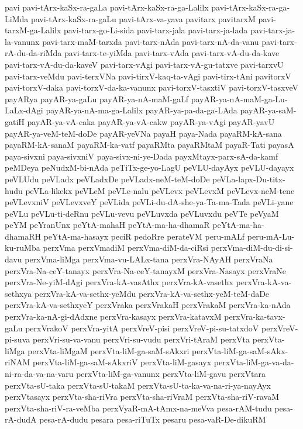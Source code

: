 {pavi
pavi-tArx-kaSx-ra-gaLa
pavi-tArx-kaSx-ra-ga-Lalilx
pavi-tArx-kaSx-ra-ga-LiMda
pavi-tArx-kaSx-ra-gaLu
pavi-tArx-va-yava
pavitarx
pavitarxM
pavi-tarxM-ga-Lalilx
pavi-tarx-go-Li-sida
pavi-tarx-jala
pavi-tarx-ja-lada
pavi-tarx-ja-la-vanunx
pavi-tarx-maM-tarxda
pavi-tarx-nAda
pavi-tarx-nA-da-vanu
pavi-tarx-rA-du-da-riMda
pavi-tarx-te-yiMda
pavi-tarx-vAda
pavi-tarx-vA-du-da-kave
pavi-tarx-vA-du-da-kaveV
pavi-tarx-vAgi
pavi-tarx-vA-gu-tatxve
pavi-tarxvU
pavi-tarx-veMdu
pavi-terxVNa
pavi-tirxV-kaq-ta-vAgi
pavi-tirx-tAni
pavitorxV
pavi-torxV-daka
pavi-torxV-da-ka-vanunx
pavi-torxV-tasxtiV
pavi-torxV-tasxveV
payARya
payAR-ya-gaLu
payAR-ya-nA-maM-gaLf
payAR-ya-nA-maM-ga-Lu-LaLx-dAgi
payAR-ya-nA-ma-ga-Lalilx
payAR-ya-pa-da-ga-LAda
payAR-ya-saM-gatiH
payAR-ya-vA-caka
payAR-ya-vA-cakw
payAR-ya-vAgi
payAR-yavU
payAR-ya-veM-teM-doDe
payAR-yeVNa
payaH
paya-Nada
payaRM-kA-sana
payaRM-kA-sanaM
payaRM-ka-vatf
payaRMta
payaRMtaM
payaR-Tati
payasA
paya-sivxni
paya-sivxniV
paya-sivx-ni-ye-Dada
payxMtayx-parx-sA-da-kamf
peMDeya
peNudxM-bi-nAda
peTiTx-ge-yo-LagU
peVLU-dayAyx
peVLU-dayayx
peVLUdu
peVLadx
peVLadxDe
peVLadx-neM-teM-doDe
peVLa-lapx-Du-titx-hudu
peVLa-likekx
peVLeM
peVLe-nalu
peVLevx
peVLevxM
peVLevx-neM-tene
peVLevxniV
peVLevxveY
peVLida
peVLi-du-dA-she-ya-Ta-ma-Tada
peVLi-yane
peVLu
peVLu-ti-deRnu
peVLu-vevu
peVLuvxda
peVLuvxdu
peVTe
peVyaM
peYM
peYranUnx
peYtA-mahaH
peYtA-ma-ha-dhamaR
peYtA-ma-ha-dhamaRH
peYtA-ma-hasayx
peciR
pedoRre
perateVM
peru-mALf
peru-mA-Lu-ku-ruMba
perxVma
perxVmadiM
perxVma-diM-da-ciRsi
perxVma-diM-du-di-si-davu
perxVma-liMga
perxVma-vu-LALx-tana
perxVra-NAyAH
perxVraNa
perxVra-Na-ceY-tanayx
perxVra-Na-ceY-tanayxM
perxVra-Nasayx
perxVraNe
perxVra-Ne-yiM-dAgi
perxVra-kA-vasAthx
perxVra-kA-vasethx
perxVra-kA-va-sethxya
perxVra-kA-va-sethx-yeMdu
perxVra-kA-va-sethx-yeM-teM-daDe
perxVra-kA-va-sethxyeY
perxVraka
perxVrakaH
perxVrakaM
perxVra-ka-nAda
perxVra-ka-nA-gi-dAdxne
perxVra-kasayx
perxVra-katavxM
perxVra-ka-tavx-gaLu
perxVrakoV
perxVra-yitA
perxVreV-pisi
perxVreV-pi-su-tatxdoV
perxVreV-pi-suva
perxVri-su-va-vanu
perxVri-su-vudu
perxVri-tAraM
perxVta
perxVta-liMga
perxVta-liMgaM
perxVta-liM-ga-saM-sAkxri
perxVta-liM-ga-saM-sAkx-riNAM
perxVta-liM-ga-saM-sAkxriV
perxVta-liM-gasayx
perxVta-liM-ga-va-da-ni-ra-da-va-na-varu
perxVta-liM-ga-vanunx
perxVta-liM-gavu
perxVtara
perxVta-sU-taka
perxVta-sU-takaM
perxVta-sU-ta-ka-va-na-ri-ya-nayAyx
perxVtasayx
perxVta-sha-riVra
perxVta-sha-riVraM
perxVta-sha-riV-ravaM
perxVta-sha-riV-ra-veMba
perxVyaR-mA-tAmx-na-meVva
pesa-rAM-tudu
pesa-rA-dudA
pesa-rA-dudu
pesara
pesa-riTuTx
pesaru
pesa-vaR-De-dikuRM
}
